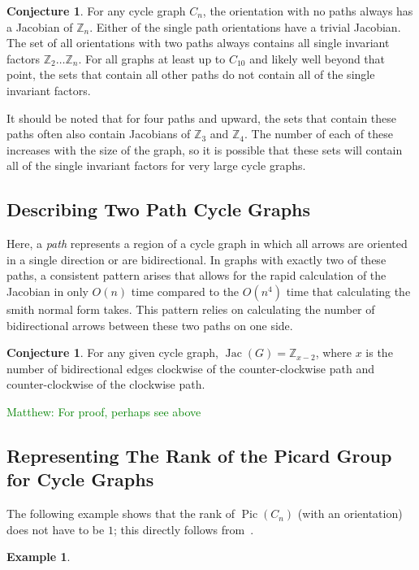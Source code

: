 \documentclass[11pt,reqno]{amsart}
\DeclareMathOperator{\Pic}{Pic}
\DeclareMathOperator{\Jac}{Jac}
\theoremstyle{definition}
\newtheorem{myeg}[mydef]{\textbf{Example}}
\newtheorem{conj}[mydef]{\textbf{Conjecture}}
\theoremstyle{plain}
\begin{document}
		\begin{conj}
			For any cycle graph $C_n$, the orientation with no paths always has a Jacobian of $\mathbb{Z}_n$.
			Either of the single path orientations have a trivial Jacobian.
			The set of all orientations with two paths always contains all single invariant factors
			$\mathbb{Z}_2\dots\mathbb{Z}_n$.  For all graphs at least up to $C_{10}$ and likely well beyond that
			point, the sets that contain all other paths do not contain all of the single invariant factors.
		\end{conj}

		It should be noted that for four paths and upward, the sets that contain these paths often also contain
		Jacobians of $\mathbb{Z}_3$ and $\mathbb{Z}_4$.  The number of each of these increases with the size of the
		graph, so it is possible that these sets will contain all of the single invariant factors for very
		large cycle graphs.

	\subsection{Describing Two Path Cycle Graphs}
		Here, a \textit{path} represents a region of a cycle graph in which all arrows are oriented in a single
		direction or are bidirectional.  In graphs with exactly two of these paths, a consistent pattern arises
		that allows for the rapid calculation of the Jacobian in only $O(n)$ time compared to the $O(n^4)$ time
		that calculating the smith normal form takes. This pattern relies on calculating the number
		of bidirectional arrows between these two paths on one side.

		\begin{conj}
			For any given cycle graph, $\Jac(G)=\mathbb{Z}_{x-2}$, where $x$ is the number of
			bidirectional edges clockwise of the counter-clockwise path and counter-clockwise of the clockwise path.
		\end{conj}
		\textcolor{green}{Matthew: For proof, perhaps see above}

	\subsection{Representing The Rank of the Picard Group for Cycle Graphs}
		The following example shows that the rank of $\Pic(C_n)$ (with an orientation) does not have to be $1$;
		this directly follows from~\cite[Corollary 3.5]{wagner2000critical}.

		\begin{myeg}
		\end{myeg}
\end{document}
